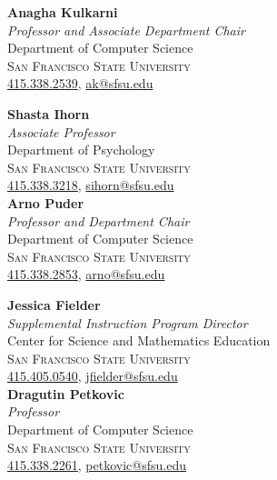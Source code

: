\documentclass[hidelinks, 10.5pt]{article}
\def\contentwidth{0.9\linewidth}    %
\begin{document}
{\begin{minipage}[ct]{\contentwidth}
\begin{multicols}{2}
        \textbf{Anagha Kulkarni}\\
        \emph{Professor and Associate Department Chair}\\
        {Department of Computer Science}\\
        \textsc{San Francisco State University}\\
        \href{tel:4153382539}{415.338.2539}, \href{mailto:ak@sfsu.edu}{ak@sfsu.edu}\\
    \end{multicols}
\end{minipage}

\begin{minipage}[ct]{\contentwidth}
    \begin{multicols}{2}
        \textbf{Shasta Ihorn}\\
        \emph{Associate Professor}\\
        {Department of Psychology}\\
        \textsc{San Francisco State University}\\
        \href{tel:4153383218}{415.338.3218}, \href{mailto:sihorn@sfsu.edu}{sihorn@sfsu.edu}\\

        \textbf{Arno Puder}\\
        \emph{Professor and Department Chair}\\
        {Department of Computer Science}\\
        \textsc{San Francisco State University}\\
        \href{tel:4153382853}{415.338.2853}, \href{mailto:arno@sfsu.edu}{arno@sfsu.edu}\\
    \end{multicols}
\end{minipage}

\begin{minipage}[ct]{\contentwidth}
    \begin{multicols}{2}
        \textbf{Jessica Fielder}\\
        \emph{Supplemental Instruction Program Director}\\
        {Center for Science and Mathematics Education}\\
        \textsc{San Francisco State University}\\
        \href{tel:4154050540}{415.405.0540}, \href{mailto:jfielder@sfsu.edu}{jfielder@sfsu.edu}\\

        \textbf{Dragutin Petkovic}\\
        \emph{Professor}\\
        {Department of Computer Science}\\
        \textsc{San Francisco State University}\\
        \href{tel:4153382261}{415.338.2261}, \href{mailto:petkovic@sfsu.edu}{petkovic@sfsu.edu}\\
    \end{multicols}
\end{minipage}

}
\end{document}
